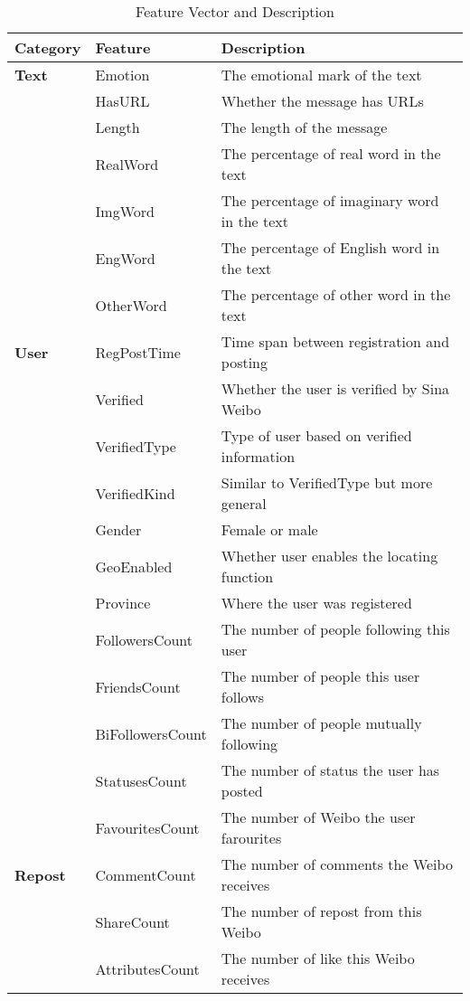 \begin{table}[h] \centering 
\begin{tabular}{lll}
\toprule
\textbf{Category} & \textbf{Feature} & \textbf{Description} \\
\midrule
\textbf{Text} & Emotion & The emotional mark of the text\\
& HasURL & Whether the message has URLs\\
& Length & The length of the message\\
& RealWord & The percentage of real word in the text\\
& ImgWord & The percentage of imaginary word in the text\\
& EngWord & The percentage of English word in the text\\
& OtherWord & The percentage of other word in the text\\
\textbf{User} & RegPostTime & Time span between registration and posting\\
& Verified & Whether the user is verified by Sina Weibo\\
& VerifiedType & Type of user based on verified information\\
& VerifiedKind & Similar to VerifiedType but more general\\
& Gender & Female or male\\
& GeoEnabled & Whether user enables the locating function\\
& Province & Where the user was registered\\
& FollowersCount & The number of people following this user\\
& FriendsCount & The number of people this user follows\\
& BiFollowersCount & The number of people mutually following\\
& StatusesCount & The number of status the user has posted\\
& FavouritesCount & The number of Weibo the user farourites\\
\textbf{Repost} & CommentCount & The number of comments the Weibo receives\\
& ShareCount & The number of repost from this Weibo\\
& AttributesCount & The number of like this Weibo receives\\
\bottomrule
\end{tabular}
\caption{Feature Vector and Description}
\label{Table:FeatureVector}
\end{table}



